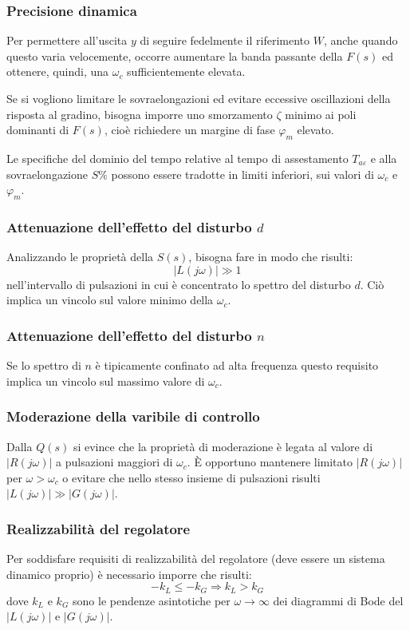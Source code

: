 \documentclass[a4paper]{report}
\begin{document}
\subsubsection{Precisione dinamica}
Per permettere all'uscita $y$ di seguire fedelmente il riferimento
$W$, anche quando questo varia velocemente, occorre aumentare la banda
passante della $F(s)$ ed ottenere, quindi, una $\omega_c$
sufficientemente elevata.

Se si vogliono limitare le sovraelongazioni ed evitare eccessive
oscillazioni della risposta al gradino, bisogna imporre uno
smorzamento $\zeta$ minimo ai poli dominanti di $F(s)$, cio\`e
richiedere un margine di fase $\varphi_m$ elevato.

Le specifiche del dominio del tempo relative al tempo di assestamento
$T_{a\varepsilon}$ e alla sovraelongazione $S\%$ possono essere
tradotte in limiti inferiori, sui valori di $\omega_c$ e $\varphi_m$.

\subsubsection{Attenuazione dell'effetto del disturbo $d$}
Analizzando le propriet\`a della $S(s)$, bisogna fare in modo che
risulti:
\[
|L(j \omega)| \gg 1
\]
nell'intervallo di pulsazioni in cui \`e concentrato lo spettro del
disturbo $d$. Ci\`o implica un vincolo sul valore minimo della
$\omega_c$.

\subsubsection{Attenuazione dell'effetto del disturbo $n$}
Se lo spettro di $n$ \`e tipicamente confinato ad alta frequenza
questo requisito implica un vincolo sul massimo valore di $\omega_c$.

\subsubsection{Moderazione della varibile di controllo}
Dalla $Q(s)$ si evince che la propriet\`a di moderazione \`e legata al
valore di $|R(j \omega)|$ a pulsazioni maggiori di $\omega_c$. \`E
opportuno mantenere limitato $|R(j \omega)|$ per $\omega > \omega_c$ o
evitare che nello stesso insieme di pulsazioni risulti $|L(j \omega)|
\gg |G(j \omega)|$.

\subsubsection{Realizzabilit\`a del regolatore}
Per soddisfare requisiti di realizzabilit\`a del regolatore (deve
essere un sistema dinamico proprio) \`e necessario imporre che
risulti:
\[
-k_L \leq -k_G \Rightarrow k_L > k_G
\]
dove $k_L$ e $k_G$ sono le pendenze asintotiche per $\omega \to
\infty$ dei diagrammi di Bode del $|L(j \omega)|$ e $|G(j \omega)|$.
\end{document}
